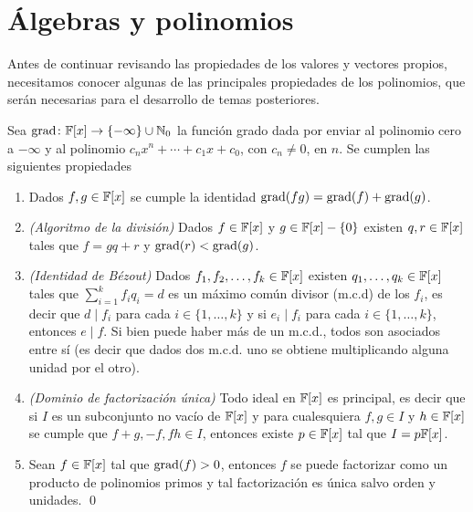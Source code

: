 \section{Álgebras y polinomios}

Antes de continuar revisando las propiedades de los valores y vectores propios, necesitamos conocer algunas de las principales propiedades de los polinomios, que serán necesarias para el desarrollo de temas posteriores.


\begin{teor}
  Sea $\operatorname{grad}\colon \mathbb{F}[x] \to \{-\infty\} \cup \mathbb{N}_0$ la función grado dada por enviar al polinomio cero a $-\infty$ y al polinomio $c_n x^n + \cdots + c_1x + c_0$, con $c_n \neq 0$, en $n$. Se cumplen las siguientes propiedades
  \begin{enumerate}
    \item Dados $f, g \in \mathbb{F}[x]$ se cumple la identidad $\operatorname{grad}(fg) = \operatorname{grad}(f) + \operatorname{grad}(g)$.
    
    \item \emph{(Algoritmo de la división)} Dados $f \in \mathbb{F}[x]$ y $g \in \mathbb{F}[x] - \{0\}$ existen $q, r \in \mathbb{F}[x]$ tales que $f = gq+r$ y $\operatorname{grad}(r) < \operatorname{grad}(g)$.
    
    \item \emph{(Identidad de Bézout)} Dados $f_1, f_2, \ldots, f_k \in \mathbb{F}[x]$ existen $q_1, \ldots, q_k \in \mathbb{F}[x]$ tales que $\sum_{i=1}^k f_i q_i = d$ es un máximo común divisor (m.c.d) de los $f_i$, es decir que $d \mid f_i$ para cada $i \in \{1,\ldots,k\}$ y si $e_i \mid f_i$ para cada $i \in \{1,\ldots,k\}$, entonces $e \mid f$. Si bien puede haber más de un m.c.d., todos son asociados entre sí (es decir que dados dos m.c.d. uno se obtiene multiplicando alguna unidad por el otro).
    
    \item \emph{(Dominio de factorización única)} Todo ideal en $\mathbb{F}[x]$ es principal, es decir que si $I$ es un subconjunto no vacío de $\mathbb{F}[x]$ y para cualesquiera $f, g \in I$ y $h \in \mathbb{F}[x]$ se cumple que $f+g, -f, fh \in I$, entonces existe $p \in \mathbb{F}[x]$ tal que $I = p\mathbb{F}[x]$.
    
    \item Sean $f \in \mathbb{F}[x]$ tal que $\operatorname{grad}(f)>0$, entonces $f$ se puede factorizar como un producto de polinomios primos y tal factorización es única salvo orden y unidades. \qed
  \end{enumerate}
\end{teor}
 


